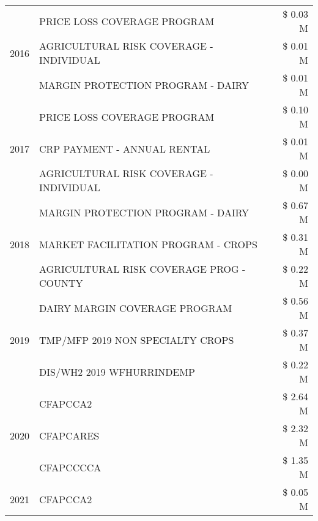 \begin{tabular}{llr}
\cline{1-3}
\multirow[t]{3}{*}{2016} & PRICE LOSS COVERAGE PROGRAM & \$ 0.03 M \\
 & AGRICULTURAL RISK COVERAGE - INDIVIDUAL & \$ 0.01 M \\
 & MARGIN PROTECTION PROGRAM - DAIRY & \$ 0.01 M \\
\cline{1-3}
\multirow[t]{3}{*}{2017} & PRICE LOSS COVERAGE PROGRAM & \$ 0.10 M \\
 & CRP PAYMENT - ANNUAL RENTAL & \$ 0.01 M \\
 & AGRICULTURAL RISK COVERAGE - INDIVIDUAL & \$ 0.00 M \\
\cline{1-3}
\multirow[t]{3}{*}{2018} & MARGIN PROTECTION PROGRAM - DAIRY & \$ 0.67 M \\
 & MARKET FACILITATION PROGRAM - CROPS & \$ 0.31 M \\
 & AGRICULTURAL RISK COVERAGE PROG - COUNTY & \$ 0.22 M \\
\cline{1-3}
\multirow[t]{3}{*}{2019} & DAIRY MARGIN COVERAGE PROGRAM & \$ 0.56 M \\
 & TMP/MFP 2019 NON SPECIALTY CROPS & \$ 0.37 M \\
 & DIS/WH2 2019 WFHURRINDEMP & \$ 0.22 M \\
\cline{1-3}
\multirow[t]{3}{*}{2020} & CFAPCCA2 & \$ 2.64 M \\
 & CFAPCARES & \$ 2.32 M \\
 & CFAPCCCCA & \$ 1.35 M \\
\cline{1-3}
2021 & CFAPCCA2 & \$ 0.05 M \\
\cline{1-3}
\bottomrule
\end{tabular}
